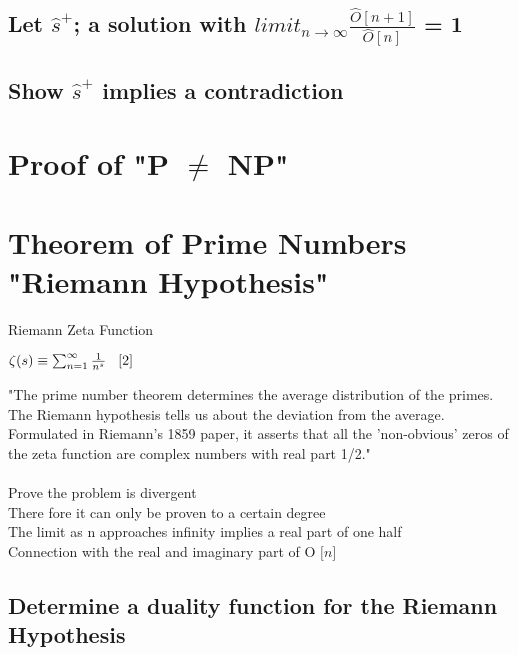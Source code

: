 \documentclass[11pt]{article}
\begin{document}
\subsection{Let $\hat{s}^+$; a solution with $limit_{n \rightarrow \infty} \frac{\hat{O}[n+1]}{\hat{O}[n]}$ = 1}
\subsection{Show $\hat{s}^+$ implies a contradiction}





\newpage
\section{Proof of "P $\neq$ NP"}











\newpage
\section{Theorem of Prime Numbers "Riemann Hypothesis"}
Riemann Zeta Function
\begin{center}
$
\zeta (s) \equiv \sum_{n=1}^{\infty} \frac{1}{n^s} \hspace{3mm} \lbrack 2 \rbrack
$
\end{center}
"The prime number theorem determines the average distribution of the primes. The Riemann hypothesis tells us about the deviation from the average. Formulated in Riemann's 1859 paper, it asserts that all the 'non-obvious' zeros of the zeta function are complex numbers with real part 1/2." \rbrack\\
\\
Prove the problem is divergent\\
There fore it can only be proven to a certain degree\\
The limit as n approaches infinity implies a real part of one half\\
Connection with the real and imaginary part of O $\lbrack n \rbrack$

\subsection{Determine a duality function for the Riemann Hypothesis}
\end{document}
